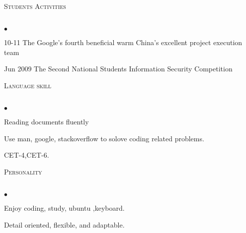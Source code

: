 \documentclass{article}
\newcommand{\lineunder}{\vspace*{-8pt} \\ \hspace*{-18pt} \hrulefill \\}
\newcommand{\header}[1]{{\hspace*{-15pt}\vspace*{6pt} \textsc{#1}} \vspace*{-6pt} \lineunder}
\newenvironment{achievements}{\begin{list}{$\bullet$}{\topsep 0pt \itemsep -2pt}}{\vspace*{4pt}\end{list}}
\begin{document}
\header{Students Activities}
	\begin{achievements}
		\item 10-11 The Google’s fourth beneficial warm China's excellent project execution team 
		\item Jun 2009 The Second  National Students Information Security Competition
	\end{achievements}
\header{Language skill}
	\begin{achievements}
		\item Reading documents fluently  
		\item Use man, google, stackoverflow to solove coding related problems. 
		\item CET-4,CET-6.
	\end{achievements}
\header{Personality}
	\begin{achievements}
	\item Enjoy coding, study, ubuntu ,keyboard. 
	\item Detail oriented, flexible, and adaptable.
	\end{achievements}	
\end{document}
